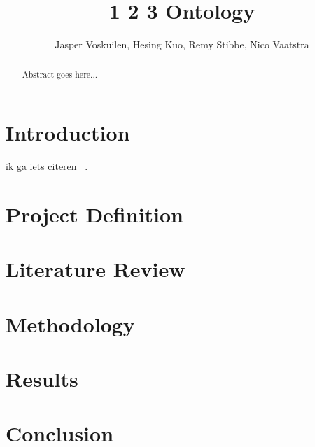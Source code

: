 \documentclass[oribibl]{llncs}
\begin{document}
\title{1 2 3 Ontology}
\author{Jasper Voskuilen, Hesing Kuo, Remy Stibbe, Nico Vaatstra}


\maketitle
\begin{abstract}
Abstract goes here...
\end{abstract}

\newpage
\section{Introduction}
ik ga iets citeren ~\cite{mustapha}. \cite{staab}
\cite{hearstWordNet} \cite{hearstThesis}

\newpage
\section{Project Definition}

\newpage
\section{Literature Review}

\newpage
\section{Methodology}

\newpage
\section{Results}

\newpage
\section{Conclusion}

%

\newpage

\end{document}
